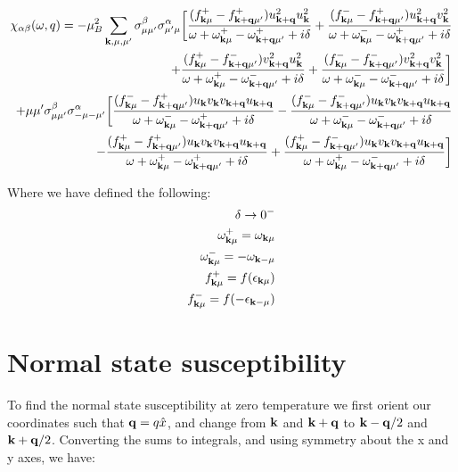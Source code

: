 \documentclass[prb,showpacs,amssymb,amsmath,twocolumn]{revtex4-1}
\begin{document}
\begin{widetext}
\begin{align*}
\chi_{\alpha\beta}(\omega,q) =- \mu_B^2 \sum\limits_{{\bf k},\mu,\mu'} \sigma^\beta_{\mu\mu'}\sigma^\alpha_{\mu'\mu} \bigg[\frac{(f^+_{{\bf k}\mu}-f^+_{{\bf k}+{\bf q}\mu'})u_{{\bf k}+{\bf q}}^2u_{\bf k}^2} {\omega+\omega^+_{{\bf k}\mu}- \omega^+_{{\bf k}+{\bf q}\mu'}+i\delta}
+\frac{(f^-_{{\bf k}\mu}-f^+_{{\bf k}+{\bf q}\mu'})u_{{\bf k}+{\bf q}}^2v_{\bf k}^2} {\omega+\omega^-_{{\bf k}\mu}-\omega^+_{{\bf k}+{\bf q}\mu'}+i\delta}\\
+\frac{(f^+_{{\bf k}\mu}-f^-_{{\bf k}+{\bf q}\mu'})v_{{\bf k}+{\bf q}}^2u_{\bf k}^2} {\omega+\omega^+_{{\bf k}\mu}-\omega^-_{{\bf k}+{\bf q}\mu'}+i\delta}
+\frac{(f^-_{{\bf k}\mu}-f^-_{{\bf k}+{\bf q}\mu'})v_{{\bf k}+{\bf q}}^2v_{\bf k}^2} {\omega+\omega^-_{{\bf k}\mu}-\omega^-_{{\bf k}+{\bf q}\mu'}+i\delta}\bigg] 
\\
+\mu\mu' \sigma^\beta_{\mu\mu'}\sigma^\alpha_{-\mu-\mu'}\bigg[\frac{(f^-_{{\bf k}\mu}-f^+_{{\bf k}+{\bf q}\mu'})u_{\bf k} v_{\bf k} v_{{\bf k}+{\bf q}}u_{{\bf k}+{\bf q}}} {\omega+ \omega^-_{{\bf k}\mu}-\omega^+_{{\bf k}+{\bf q}\mu'} +i\delta}
-\frac{(f^-_{{\bf k}\mu}-f^-_{{\bf k}+{\bf q}\mu'})u_{\bf k} v_{\bf k} v_{{\bf k}+{\bf q}}u_{{\bf k}+{\bf q}}} {\omega+\omega^-_{{\bf k}\mu}-\omega^-_{{\bf k}+{\bf q}\mu'}+i\delta} \\
-\frac{(f^+_{{\bf k}\mu}-f^+_{{\bf k}+{\bf q}\mu'})u_{\bf k} v_{\bf k} v_{{\bf k}+{\bf q}}u_{{\bf k}+{\bf q}}} {\omega+\omega^+_{{\bf k}\mu}-\omega^+_{{\bf k}+{\bf q}\mu'}+i\delta}
+\frac{(f^+_{{\bf k}\mu}-f^-_{{\bf k}+{\bf q}\mu'})u_{\bf k} v_{\bf k} v_{{\bf k}+{\bf q}}u_{{\bf k}+{\bf q}}} {\omega+\omega^+_{{\bf k}\mu}-\omega^-_{{\bf k}+{\bf q}\mu'}+i\delta}\bigg]
\end{align*}

Where we have defined the following:
\begin{align*}
\delta \rightarrow 0^- \\
\omega^+_{{\bf k}\mu} = \omega_{{\bf k}\mu} \\
\omega^-_{{\bf k}\mu} = -\omega_{{\bf k}-\mu} \\
f^+_{{\bf k}\mu} = f(\epsilon_{{\bf k}\mu}) \\
f^-_{{\bf k}\mu} = f(-\epsilon_{{\bf k}-\mu})
\end{align*}

\section{\label{sec:appB} Normal state susceptibility} 
%
To find the normal state susceptibility at zero temperature we first orient our coordinates such that ${\bf q}=q\hat{x}$, and change from ${\bf k}$ and ${\bf k+q}$ to ${\bf k-q}/2$ and ${\bf k+q}/2$. Converting the sums to integrals, and using symmetry about the x and y axes, we have:
 

\end{widetext}
\end{document}
